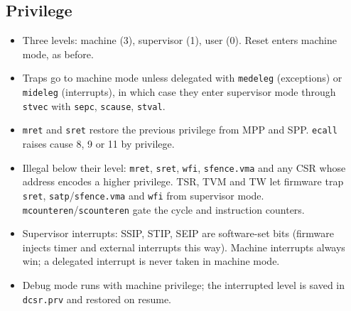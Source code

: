 \documentclass[10pt,a4paper]{article}
\newcommand{\code}[1]{\texttt{#1}}
\begin{document}
\subsection{Privilege}
\begin{itemize}
\item Three levels: machine (3), supervisor (1), user (0). Reset enters machine mode, as before.
\item Traps go to machine mode unless delegated with \code{medeleg} (exceptions) or \code{mideleg} (interrupts), in which case they enter supervisor mode through \code{stvec} with \code{sepc}, \code{scause}, \code{stval}.
\item \code{mret} and \code{sret} restore the previous privilege from MPP and SPP. \code{ecall} raises cause 8, 9 or 11 by privilege.
\item Illegal below their level: \code{mret}, \code{sret}, \code{wfi}, \code{sfence.vma} and any CSR whose address encodes a higher privilege. TSR, TVM and TW let firmware trap \code{sret}, \code{satp}/\code{sfence.vma} and \code{wfi} from supervisor mode. \code{mcounteren}/\code{scounteren} gate the cycle and instruction counters.
\item Supervisor interrupts: SSIP, STIP, SEIP are software-set bits (firmware injects timer and external interrupts this way). Machine interrupts always win; a delegated interrupt is never taken in machine mode.
\item Debug mode runs with machine privilege; the interrupted level is saved in \code{dcsr.prv} and restored on resume.
\end{itemize}
\end{document}
